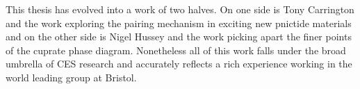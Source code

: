 
This thesis has evolved into a work of two halves. On one side is Tony Carrington and the work exploring the pairing mechanism in exciting new pnictide materials and on the other side is Nigel Hussey and the work picking apart the finer points of the cuprate phase diagram. Nonetheless all of this work falls under the broad umbrella of CES research and accurately reflects a rich experience working in the world leading group at Bristol.
